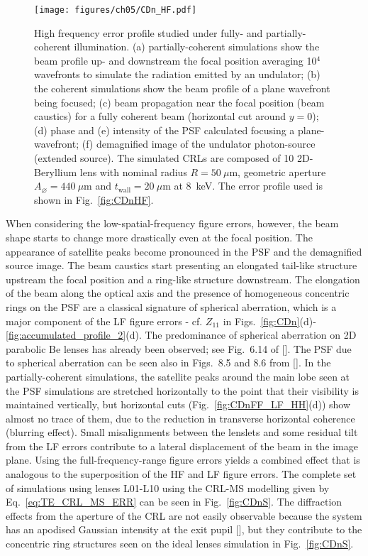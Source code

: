 \begin{refsection}
\begin{figure}[t]
        \centering
        {\texttt{[image: figures/ch05/CDn\_HF.pdf]}}
        \caption[High frequency errors studied under fully- and partially-coherent illuminations]{High frequency error profile studied under fully- and partially-coherent illumination. (a) partially-coherent simulations show the beam profile up- and downstream the focal position averaging 10$^{4}$ wavefronts to simulate the radiation emitted by an undulator; (b) the coherent simulations show the beam profile of a plane wavefront being focused; (c) beam propagation near the focal position (beam caustics) for a fully coherent beam (horizontal cut around $y=0$); (d) phase and (e) intensity of the PSF calculated focusing a plane-wavefront; (f) demagnified image of the undulator photon-source (extended source). The simulated CRLs are composed of 10 2D-Beryllium lens with nominal radius $R=50~\mu\text{m}$, geometric aperture $A_{\diameter}=440~\mu\text{m}$ and $t_\text{wall}=20~\mu$m at 8~keV. The error profile used is shown in Fig.~\ref{fig:CDnHF}.}\label{fig:simulations_HF}
\end{figure}

When considering the low-spatial-frequency figure errors, however, the beam shape starts to change more drastically even at the focal position. The appearance of satellite peaks become pronounced in the PSF and the demagnified source image. The beam caustics start presenting an elongated tail-like structure upstream the focal position and a ring-like structure downstream. The elongation of the beam along the optical axis and the presence of homogeneous concentric rings on the PSF are a classical signature of spherical aberration, which is a major component of the LF figure errors - cf. $Z_{11}$ in Figs.~\ref{fig:CDn}(d)-\ref{fig:accumulated_profile_2}(d). The predominance of spherical aberration on 2D parabolic Be lenses has already been observed; see Fig.~6.14 of [\cite{Seiboth2016b}]. The PSF due to spherical aberration can be seen also in Figs.~8.5 and 8.6 from [\cite{Mahajan2011}]. In the partially-coherent simulations, the satellite peaks around the main lobe seen at the PSF simulations are stretched horizontally to the point that their visibility is maintained vertically, but horizontal cuts (Fig.~\ref{fig:CDnFF_LF_HH}(d)) show almost no trace of them, due to the reduction in transverse horizontal coherence (blurring effect). Small misalignments between the lenslets and some residual tilt from the LF errors contribute to a lateral displacement of the beam in the image plane. Using the full-frequency-range figure errors yields a combined effect that is analogous to the superposition of the HF and LF figure errors. The complete set of simulations using lenses L01-L10 using the CRL-MS modelling given by Eq.~\ref{eq:TE_CRL_MS_ERR} can be seen in Fig.~\ref{fig:CDnS}. The diffraction effects from the aperture of the CRL are not easily observable because the system has an apodised Gaussian intensity at the exit pupil [\cite{Mahajan1986}], but they contribute to the concentric ring structures seen on the ideal lenses simulation in Fig.~\ref{fig:CDnS}.


\end{refsection}
